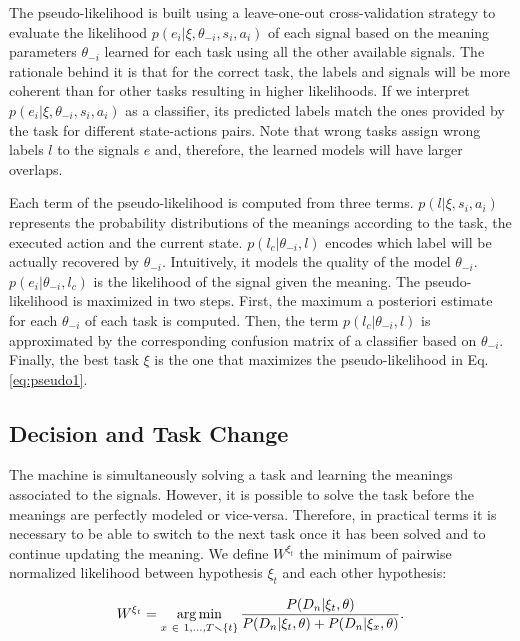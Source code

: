 The pseudo-likelihood is built using a leave-one-out cross-validation strategy to evaluate the likelihood $p(e_i | \xi, \theta_{-i},s_i,a_i)$ of each signal based on the meaning parameters $\theta_{-i}$ learned for each task using all the other available signals. The rationale behind it is that for the correct task, the labels and signals will be more coherent than for other tasks resulting in higher likelihoods. If we interpret $p(e_i | \xi, \theta_{-i},s_i,a_i)$ as a classifier, its predicted labels match the ones provided by the task for different state-actions pairs. Note that wrong tasks assign wrong labels $l$ to the signals $e$ and, therefore, the learned models will have larger overlaps. 

Each term of the pseudo-likelihood is computed from three terms. $p(l|\xi,s_i,a_i)$ represents the probability distributions of the meanings according to the task, the executed action and the current state.   $p(l_c | \theta_{-i},l)$ encodes which label will be actually recovered by $\theta_{-i}$. Intuitively, it models the quality of the model $\theta_{-i}$. $p(e_i | \theta_{-i}, l_c)$ is the likelihood of the signal given the meaning. 
%
The pseudo-likelihood is maximized in two steps. First, the maximum a posteriori estimate for each $\theta_{-i}$ of each task  is computed. Then, the term $p(l_c | \theta_{-i},l)$ is approximated by the corresponding confusion matrix of a classifier based on $\theta_{-i}$. Finally, the best task $\xi$ is the one that maximizes the pseudo-likelihood in Eq. \ref{eq:pseudo1}.

\subsection{Decision and Task Change}

The machine is simultaneously solving a task and learning the meanings associated to the signals. However, it is possible to solve the task before the meanings are perfectly modeled or vice-versa. Therefore, in practical terms it is necessary to be able to switch to the next task once it has been solved and to continue updating the meaning. 
%
We define $W^{\xi_t}$ the minimum of pairwise normalized likelihood between hypothesis $\xi_t$ and each other hypothesis: 

\begin{eqnarray}
W^{\xi_t} = \argmin_{x~\in~{1, \ldots, T} \smallsetminus \{t\}} \frac{P(D_n | \xi_t, \theta)}{P(D_n | \xi_t, \theta) + P(D_n | \xi_x, \theta)}.
\label{eq:weight}
\end{eqnarray}

